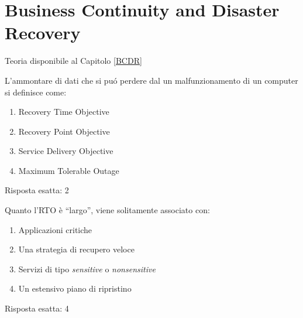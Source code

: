 \chapter{Business Continuity and Disaster Recovery}
\label{EsBCDR1}

Teoria disponibile al Capitolo \ref{BCDR}

\begin{Exercise} [
  title={Definizioni},
  label={bcdr1}
 ]

 \Question L'ammontare di dati che si puó perdere dal un malfunzionamento di
un computer si definisce come:
\begin{enumerate}
  \item Recovery Time Objective
  \item Recovery Point Objective
  \item Service Delivery Objective
  \item Maximum Tolerable Outage
\end{enumerate}

\end{Exercise}

\begin{Answer} [
   ref={bcdr1},
   number={1}
 ]

  \Question Risposta esatta: 2

\end{Answer}


\begin{Exercise} [
  title={RTO Largo},
  label={bcdr2}
 ]

 \Question Quanto l'RTO è ``largo'', viene solitamente associato con:
\begin{enumerate}
  \item Applicazioni critiche
  \item Una strategia di recupero veloce
  \item Servizi di tipo \textit{sensitive} o \textit{nonsensitive}
  \item Un estensivo piano di ripristino
\end{enumerate}

\end{Exercise}

\begin{Answer} [
   ref={bcdr2},
   number={2}
 ]

  \Question Risposta esatta: 4

\end{Answer}


